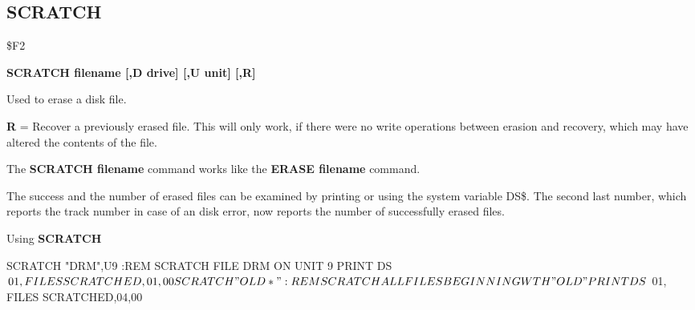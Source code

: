 
\newpage
\subsection{SCRATCH}
\begin{description}[leftmargin=3cm,style=nextline]
\item [Token:] \$F2
\item [Format:] {\bf SCRATCH filename [,D drive] [,U unit] [,R]}
\item [Usage:] Used to erase a disk file.

   \filenamedefinition

   \drivedefinition

   \unitdefinition

   {\bf R} = Recover a previously erased file.
   This will only work, if there were no write operations
   between erasion and recovery, which may have altered the
   contents of the file.

\item [Remarks:] The {\bf SCRATCH filename} command works like the
                 {\bf ERASE filename} command.

                 The success and the number of erased files can
                 be examined by printing or using the system
                 variable DS\$. The second last number, which
                 reports the track number in case of an disk error,
                 now reports the number of successfully erased files.

\item [Example:] Using {\bf SCRATCH}
\begin{screenoutput}
  SCRATCH "DRM",U9 :REM SCRATCH FILE DRM ON UNIT 9
  PRINT DS$
  01, FILES SCRATCHED,01,00
  SCRATCH "OLD*"   :REM SCRATCH ALL FILES BEGINNING WTH "OLD"
  PRINT DS$
  01, FILES SCRATCHED,04,00
\end{screenoutput}
\end{description}


\newpage

